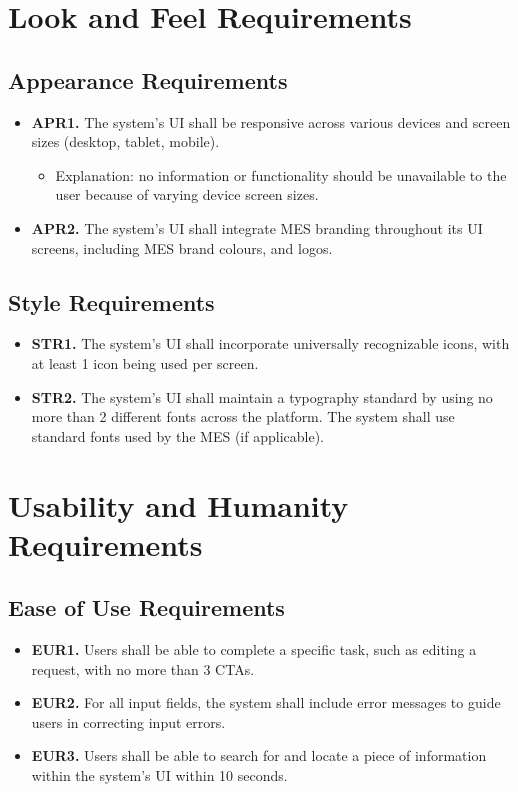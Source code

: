 \documentclass[12pt]{article}
\begin{document}
\section{Look and Feel Requirements}
\subsection{Appearance Requirements}

\begin{itemize}
    \item \textbf{APR1.} The system's UI shall be responsive across various devices and screen sizes (desktop, tablet, mobile).
    \begin{itemize}
        \item Explanation: no information or functionality should be unavailable to the user because of varying device screen sizes.
    \end{itemize}
    \item \textbf{APR2.} The system's UI shall integrate MES branding throughout its UI screens, including MES brand colours, and logos.
\end{itemize}

\subsection{Style Requirements}
\begin{itemize}
    \item \textbf{STR1.} The system's UI shall incorporate universally recognizable icons, with at least 1 icon being used per screen.
    \item \textbf{STR2.} The system's UI shall maintain a typography standard by using no more than 2 different fonts across the platform. The system shall use standard fonts used by the MES (if applicable).
\end{itemize}

\section{Usability and Humanity Requirements}
\subsection{Ease of Use Requirements}

\begin{itemize}
    \item \textbf{EUR1.} Users shall be able to complete a specific task, such as editing a request, with no more than 3 CTAs.
    \item \textbf{EUR2.} For all input fields, the system shall include error messages to guide users in correcting input errors.
    \item \textbf{EUR3.} Users shall be able to search for and locate a piece of information within the system's UI within 10 seconds.
\end{itemize}
\end{document}
